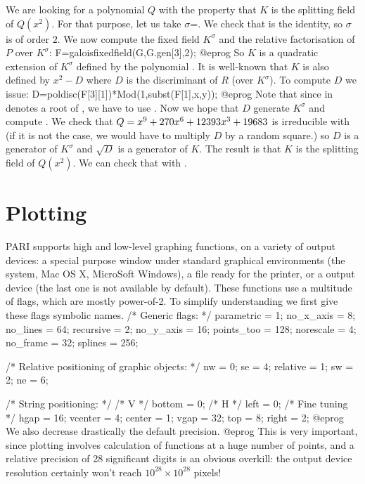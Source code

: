 We are looking for a polynomial $Q$ with the property that $K$ is the splitting
field of $Q(x^2)$. For that purpose, let us take $\sigma$=.  We
check that  is the identity, so $\sigma$ is of order $2$. We now compute the fixed field $K^\sigma$ and the relative factorisation of $P$ over
$K^\sigma$: 
\bprog 
F=galoisfixedfield(G,G.gen[3],2); 
@eprog
So $K$ is a quadratic extension of $K^\sigma$ defined by the polynomial
. It is well-known that $K$ is also defined by $x^2-D$
where $D$ is the discriminant of $R$ (over $K^\sigma$).
To compute $D$ we issue:
\bprog
D=poldisc(F[3][1])*Mod(1,subst(F[1],x,y));
@eprog
Note that since  in  denotes a root of , we 
have to use .  Now we hope that $D$ generate $K^\sigma$ and
compute . We check that $Q=x^9+270\*x^6+12393\*x^3+19683$ is
irreducible with  (if it is not the case, we would
have to multiply $D$ by a random square.) so $D$ is a generator of $K^\sigma$
and $\sqrt{D}$ is a generator of $K$. The result is that $K$ is the splitting
field of $Q(x^2)$.  We can check that with .

\section{Plotting}

PARI supports high and low-level graphing functions, on a variety of output
devices: a special purpose window under standard graphical environments (the
 system, Mac OS X, MicroSoft Windows), a  file
ready for the printer, or a  output device (the last one
is not available by default). These functions use a multitude of flags, which
are mostly power-of-2. To simplify understanding we first give these flags
symbolic names.
\bprog
  /* Generic flags: */
  parametric = 1;  no_x_axis =  8;  no_lines   = 64;
  recursive  = 2;  no_y_axis = 16;  points_too = 128;
  norescale  = 4;  no_frame  = 32;  splines    = 256;

  /* Relative positioning of graphic objects: */
  nw       = 0;  se       = 4;  relative = 1;
  sw       = 2;  ne       = 6;

  /* String positioning: */
  /* V */ bottom  =  0;   /* H */  left   = 0;   /* Fine tuning */ hgap = 16;
          vcenter =  4;            center = 1;                     vgap = 32;
          top     =  8;            right  = 2;
@eprog\noindent
We also decrease drastically the default precision.
\bprog
@eprog\noindent
This is very important, since plotting involves calculation of functions at
a huge number of points, and a relative precision of 28 significant digits
is an obvious overkill: the output device resolution certainly won't reach
$10^{28} \times 10^{28}$ pixels!


